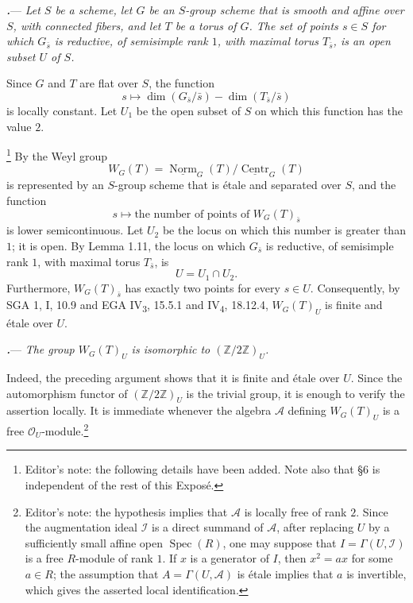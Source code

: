 
\par\medskip\noindent
{}\textbf{\textit{.}}---
\textit{Let \(S\) be a scheme, let \(G\) be an \(S\)-group scheme that
is smooth and affine over \(S\), with connected fibers, and let \(T\)
be a torus of \(G\).  The set of points \(s\in S\) for which
\(G_{\bar s}\) is reductive, of semisimple rank \(1\), with maximal
torus \(T_{\bar s}\), is an open subset \(U\) of \(S\).}

Since \(G\) and \(T\) are flat over \(S\), the function
\[
  s
  \longmapsto
  \dim(G_{\bar s}/\bar s)-\dim(T_{\bar s}/\bar s)
\]
is locally constant.  Let \(U_1\) be the open subset of \(S\) on which
this function has the value \(2\).

\footnote{Editor's note: the following details have been added.  Note
also that §6 is independent of the rest of this Exposé.}
By  the Weyl group
\[
  W_G(T)
  =
  \underline{\operatorname{Norm}}_{G}(T)/
  \underline{\operatorname{Centr}}_{G}(T)
\]
is represented by an \(S\)-group scheme that is étale and separated
over \(S\), and the function
\[
  s\longmapsto
  \text{the number of points of \(W_G(T)_{\bar s}\)}
\]
is lower semicontinuous.  Let \(U_2\) be the locus on which this number
is greater than \(1\); it is open.  By Lemma 1.11, the locus on which
\(G_{\bar s}\) is reductive, of semisimple rank \(1\), with maximal
torus \(T_{\bar s}\), is
\[
  U=U_1\cap U_2.
\]
Furthermore, \(W_G(T)_{\bar s}\) has exactly two points for every
\(s\in U\).  Consequently, by SGA 1, I, 10.9 and
EGA IV\textsubscript{3}, 15.5.1 and IV\textsubscript{4}, 18.12.4,
\(W_G(T)_U\) is finite and étale over \(U\).

\par\medskip\noindent
{}\textbf{\textit{.}}---
\textit{The group \(W_G(T)_U\) is isomorphic to
\((\mathbb Z/2\mathbb Z)_U\).}

Indeed, the preceding argument shows that it is finite and étale over
\(U\).  Since the automorphism functor of
\((\mathbb Z/2\mathbb Z)_U\) is the trivial group, it is enough to
verify the assertion locally.  It is immediate whenever the algebra
\(\mathscr A\) defining \(W_G(T)_U\) is a free
\(\mathcal O_U\)-module.\footnote{Editor's note: the hypothesis implies
that \(\mathscr A\) is locally free of rank \(2\).  Since the
augmentation ideal \(\mathscr I\) is a direct summand of \(\mathscr A\),
after replacing \(U\) by a sufficiently small affine open
\(\operatorname{Spec}(R)\), one may suppose that
\(I=\Gamma(U,\mathscr I)\) is a free \(R\)-module of rank \(1\).
If \(x\) is a generator of \(I\), then \(x^2=ax\) for some \(a\in R\);
the assumption that \(A=\Gamma(U,\mathscr A)\) is étale implies that
\(a\) is invertible, which gives the asserted local identification.}

